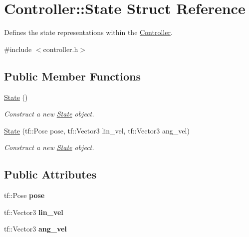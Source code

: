 \hypertarget{structController_1_1State}{}\section{Controller\+:\+:State Struct Reference}
\label{structController_1_1State}


Defines the state representations within the \hyperlink{classController}{Controller}.  




{\ttfamily \#include $<$controller.\+h$>$}

\subsection*{Public Member Functions}
\begin{DoxyCompactItemize}
\item 
\mbox{\label{structController_1_1State_abfb9cbceeaec3f0b70756e0856eff81c}} 
\hyperlink{structController_1_1State_abfb9cbceeaec3f0b70756e0856eff81c}{State} ()
\begin{DoxyCompactList}\small\item\em Construct a new \hyperlink{structController_1_1State}{State} object. \end{DoxyCompactList}\item 
\hyperlink{structController_1_1State_ab75213d196a8198fec43b6737aaac530}{State} (tf\+::\+Pose pose, tf\+::\+Vector3 lin\+\_\+vel, tf\+::\+Vector3 ang\+\_\+vel)
\begin{DoxyCompactList}\small\item\em Construct a new \hyperlink{structController_1_1State}{State} object. \end{DoxyCompactList}\end{DoxyCompactItemize}
\subsection*{Public Attributes}
\begin{DoxyCompactItemize}
\item 
\mbox{\label{structController_1_1State_a9060ab60496abb8a9658646d0f7b8cd4}} 
tf\+::\+Pose {\bfseries pose}
\item 
\mbox{\label{structController_1_1State_acaaf752c2668c1765ae9a653148df694}} 
tf\+::\+Vector3 {\bfseries lin\+\_\+vel}
\item 
\mbox{\label{structController_1_1State_a96665cd4479edd3dd44d27a1f15368dc}} 
tf\+::\+Vector3 {\bfseries ang\+\_\+vel}
\end{DoxyCompactItemize}


